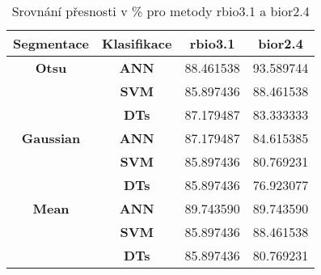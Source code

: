 \capstartfalse
\begin{table}[!htbp]
\centering
\begin{tabular}{|c|c|c|c|}
\hline
\textbf{Segmentace} & \textbf{Klasifikace} & \textbf{rbio3.1} & \textbf{bior2.4} \\ \hline
\textbf{Otsu}       & \textbf{ANN}         & 88.461538        & 93.589744        \\ \hline
\textbf{}           & \textbf{SVM}         & 85.897436        & 88.461538        \\ \hline
\textbf{}           & \textbf{DTs}         & 87.179487        & 83.333333        \\ \hline
\textbf{Gaussian}   & \textbf{ANN}         & 87.179487        & 84.615385        \\ \hline
\textbf{}           & \textbf{SVM}         & 85.897436        & 80.769231        \\ \hline
\textbf{}           & \textbf{DTs}         & 85.897436        & 76.923077        \\ \hline
\textbf{Mean}       & \textbf{ANN}         & 89.743590        & 89.743590        \\ \hline
\textbf{}           & \textbf{SVM}         & 85.897436        & 88.461538        \\ \hline
\textbf{}           & \textbf{DTs}         & 85.897436        & 80.769231        \\ \hline
\end{tabular}
\caption{Srovnání přesnosti v \% pro metody rbio3.1 a bior2.4 }
\end{table}
\capstarttrue






